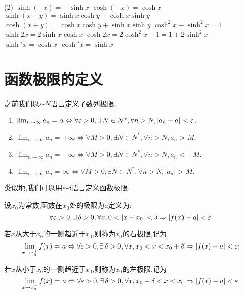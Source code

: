 \begin{tasks}[label=(\arabic*)](2)
    \task $\sinh (-x) = -\sinh x$
    \task $\cosh (-x) = \cosh x$
    \task $\sinh (x+y) = \sinh x \cosh y + \cosh x \sinh y$
    \task $\cosh (x+y) = \cosh x \cosh y + \sinh x \sinh y$
    \task $\cosh^2 x - \sinh^2 x = 1$
    \task $\sinh 2x = 2\sinh x \cosh x$
    \task $\cosh 2x = 2\cosh^2 x - 1 = 1 + 2\sinh^2 x$
    \task $\sinh' x = \cosh x $
    \task $\cosh' x = \sinh x $
\end{tasks}

\section{函数极限的定义}

之前我们以$\varepsilon$-$N$语言定义了数列极限,
\begin{definition}[数列极限]\label{def:sequence_limit_4} \quad
    \begin{enumerate}
        \item $\lim_{n \to \infty} a_n = a \Leftrightarrow \forall \ve >0, \exists N\in N^*, \forall n>N, |a_n-a|<\ve$.
        \item $\lim_{n \to \infty} a_n = +\infty \Leftrightarrow \forall M>0, \exists N\in N^*, \forall n>N, a_n>M$.
        \item $\lim_{n \to \infty} a_n = -\infty \Leftrightarrow \forall M>0, \exists N\in N^*, \forall n>N, a_n<-M$.
        \item $\lim_{n \to \infty} a_n = \infty \Leftrightarrow \forall M>0, \exists N\in N^*, \forall n>N, |a_n|>M$.
    \end{enumerate}
\end{definition}

类似地,我们可以用$\varepsilon$-$\delta$语言定义函数极限.
\begin{definition}
    设$x_0$为常数,函数在$x_0$处的极限为$a$定义为:
    $$\forall \ve >0, \exists \delta >0, \forall x, 0<|x-x_0|<\delta \Rightarrow |f(x)-a|<\ve.$$

    若$x$从大于$x_0$的一侧趋近于$x_0$,则称为$x_0$的右极限,记为$$\lim_{x \to x_0^+} f(x) = a \Leftrightarrow \forall \ve >0, \exists \delta >0, \forall x, x_0<x<x_0+\delta \Rightarrow |f(x)-a|<\ve; $$

    若$x$从小于$x_0$的一侧趋近于$x_0$,则称为$x_0$的左极限,记为$$\lim_{x \to x_0^-} f(x) = a \Leftrightarrow \forall \ve >0, \exists \delta >0, \forall x, x_0-\delta<x<x_0 \Rightarrow |f(x)-a|<\ve.$$
\end{definition}

